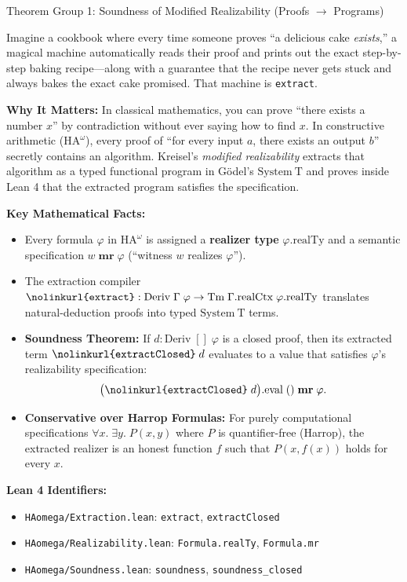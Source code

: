 \documentclass[11pt,a4paper]{article}
\newcommand{\HAomega}{\ensuremath{\mathrm{HA}^{\omega}}}
\newcommand{\SystemT}{\ensuremath{\mathrm{System\ T}}}
\newcommand{\Deriv}{\ensuremath{\mathrm{Deriv}}}
\newcommand{\Tm}{\ensuremath{\mathrm{Tm}}}
\newcommand{\lean}[1]{\texttt{\nolinkurl{#1}}}
\begin{document}
\begin{thmcard}{Theorem Group 1: Soundness of Modified Realizability (Proofs \texorpdfstring{$\to$}{->} Programs)}
\begin{eli5box}
Imagine a cookbook where every time someone proves ``a delicious cake \emph{exists},'' a magical machine automatically reads their proof and prints out the exact step-by-step baking recipe---along with a guarantee that the recipe never gets stuck and always bakes the exact cake promised. That machine is \lean{extract}.
\end{eli5box}

\textbf{Why It Matters:}
In classical mathematics, you can prove ``there exists a number $x$'' by contradiction without ever saying how to find $x$. In constructive arithmetic ($\HAomega$), every proof of ``for every input $a$, there exists an output $b$'' secretly contains an algorithm. Kreisel's \emph{modified realizability} extracts that algorithm as a typed functional program in Gödel's \SystemT{} and proves inside Lean 4 that the extracted program satisfies the specification.

\textbf{Key Mathematical Facts:}
\begin{itemize}
  \item Every formula $\varphi$ in $\HAomega$ is assigned a \textbf{realizer type} $\varphi.\mathrm{realTy}$ and a semantic specification $w \;\mathbf{mr}\; \varphi$ (``witness $w$ realizes $\varphi$'').
  \item The extraction compiler $\lean{extract} : \Deriv\;\Gamma\;\varphi \to \Tm\;\Gamma.\mathrm{realCtx}\;\varphi.\mathrm{realTy}$ translates natural-deduction proofs into typed \SystemT{} terms.
  \item \textbf{Soundness Theorem:} If $d : \Deriv\;[]\;\varphi$ is a closed proof, then its extracted term $\lean{extractClosed}\;d$ evaluates to a value that satisfies $\varphi$'s realizability specification:
  \[
    \bigl(\lean{extractClosed}\;d\bigr).\mathrm{eval}\;() \;\mathbf{mr}\; \varphi.
  \]
  \item \textbf{Conservative over Harrop Formulas:} For purely computational specifications $\forall x.\;\exists y.\;P(x,y)$ where $P$ is quantifier-free (Harrop), the extracted realizer is an honest function $f$ such that $P(x, f(x))$ holds for every $x$.
\end{itemize}

\textbf{Lean 4 Identifiers:}
\begin{itemize}
  \item \lean{HAomega/Extraction.lean}: \lean{extract}, \lean{extractClosed}
  \item \lean{HAomega/Realizability.lean}: \lean{Formula.realTy}, \lean{Formula.mr}
  \item \lean{HAomega/Soundness.lean}: \lean{soundness}, \lean{soundness_closed}
\end{itemize}
\end{thmcard}
\end{document}
